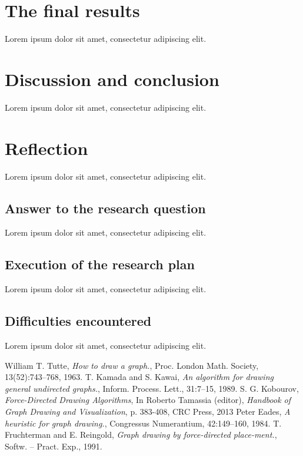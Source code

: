 \documentclass[a4paper,12pt,twoside]{article}
\begin{document}
\section{The final results}\label{s:results}
Lorem ipsum dolor sit amet, consectetur adipiscing elit.

\section{Discussion and conclusion}
Lorem ipsum dolor sit amet, consectetur adipiscing elit.

\section{Reflection}
Lorem ipsum dolor sit amet, consectetur adipiscing elit.
\subsection{Answer to the research question}
Lorem ipsum dolor sit amet, consectetur adipiscing elit.
\subsection{Execution of the research plan}
Lorem ipsum dolor sit amet, consectetur adipiscing elit.\subsection{Difficulties encountered}
Lorem ipsum dolor sit amet, consectetur adipiscing elit.

\begin{thebibliography}{99}
William T. Tutte, \emph{How to draw a graph.}, Proc. London Math. Society, 13(52):743–768, 1963.
T. Kamada and S. Kawai, \emph{An algorithm for drawing general undirected graphs.}, Inform. Process. Lett., 31:7–15, 1989.
S. G. Kobourov, \emph{Force-Directed Drawing Algorithms}, In Roberto Tamassia (editor), \emph{Handbook of Graph Drawing and Visualization}, p. 383-408, CRC Press, 2013
 Peter Eades, \emph{A heuristic for graph drawing.}, Congressus Numerantium, 42:149–160, 1984.
T. Fruchterman and E. Reingold, \emph{Graph drawing by force-directed place-ment.}, Softw. – Pract. Exp., 1991.
\end{thebibliography}
\end{document}
